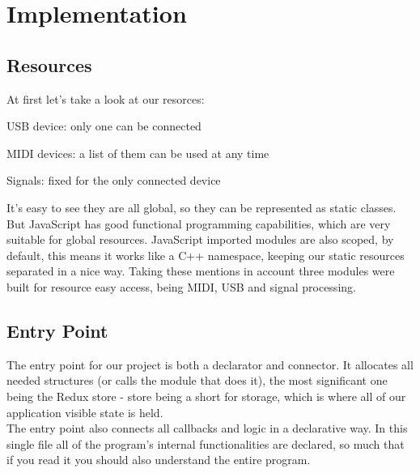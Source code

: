 \section{Implementation}

\subsection{Resources}
At first let's take a look at our resorces:
\begin{itemlist}
	\item USB device: only one can be connected
	\item MIDI devices: a list of them can be used at any time
	\item Signals: fixed for the only connected device
\end{itemlist}
It's easy to see they are all global, so they can be represented as static classes.
But JavaScript has good functional programming capabilities, which are very
suitable for global resources. JavaScript imported modules are also scoped, by default,
this means it works like a C++ namespace, keeping our static resources separated in
a nice way. Taking these mentions in account three modules were built for resource
easy access, being MIDI, USB and signal processing.

\subsection{Entry Point}
The entry point for our project is both a declarator and connector. It allocates
all needed structures (or calls the module that does it), the most significant one
being the Redux store \cite{Redux} - store being a short for storage, which is
where all of our application visible state is held. \\
The entry point also connects all callbacks and logic in a declarative way. In
this single file all of the program's internal functionalities are declared,
so much that if you read it you should also understand the entire program.

